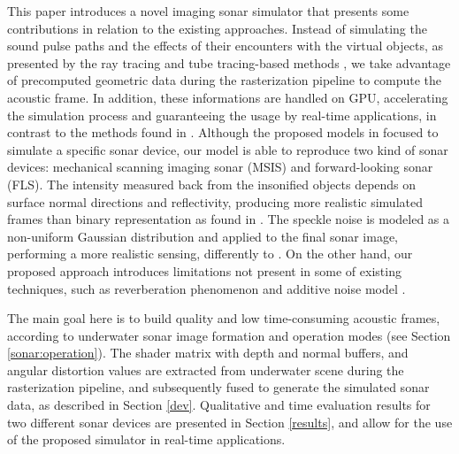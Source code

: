 \documentclass[final,5p,times]{elsarticle}
\begin{document}
This paper introduces a novel imaging sonar simulator that presents some
contributions in relation to the existing approaches. Instead of simulating
the sound pulse paths and the effects of their encounters with the virtual
objects, as presented by the ray tracing and tube tracing-based methods
\cite{bell1997,coiras2009,gueriot2010,sac2015,demarco2015,gu2013,kwak2015},
we take advantage of precomputed geometric data during the rasterization
pipeline to compute the acoustic frame. In addition, these informations are
handled on GPU, accelerating the simulation process and guaranteeing the
usage by real-time applications, in contrast to the methods found in
\cite{bell1997,coiras2009,sac2015,demarco2015}. Although the proposed models in
\cite{bell1997,coiras2009,gueriot2010,sac2015,demarco2015,gu2013,kwak2015}
focused to simulate a specific sonar device, our model is able to reproduce
two kind of sonar devices: mechanical scanning imaging sonar (MSIS)
and forward-looking sonar (FLS). The intensity measured back from the
insonified objects depends on surface normal directions and reflectivity,
producing more realistic simulated frames than binary representation as
found in \cite{gu2013,kwak2015}. The speckle noise is modeled as a non-uniform
Gaussian distribution and applied to the final sonar image, performing a more
realistic sensing, differently to
\cite{gueriot2010,sac2015,demarco2015,gu2013,kwak2015}. On the other hand,
our proposed approach introduces limitations not present in some of existing
techniques, such as reverberation phenomenon \cite{sac2015} and additive
noise model \cite{sac2015,demarco2015}.

The main goal here is to build quality and low time\hyp{}consuming acoustic
frames, according to underwater sonar image formation and operation modes
(see Section \ref{sonar:operation}). The shader matrix with depth and normal
buffers, and angular distortion values are extracted from underwater scene
during the rasterization pipeline, and subsequently fused to generate the
simulated sonar data, as described in Section \ref{dev}. Qualitative and
time evaluation results for two different sonar devices are presented in
Section \ref{results}, and allow for the use of the proposed simulator in
real-time applications.
\end{document}
